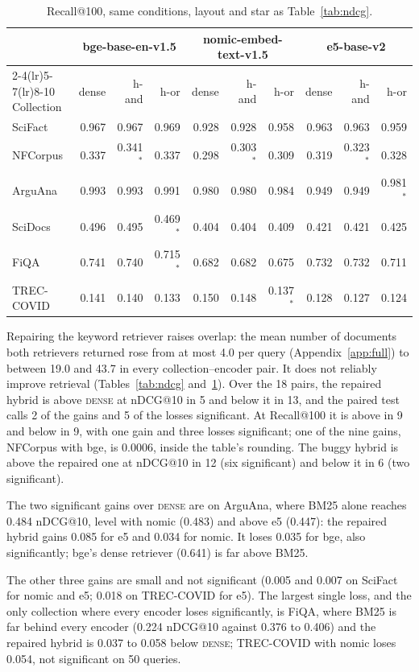 \documentclass[11pt]{article}
\begin{document}
\begin{table}[h]
\centering
\small
\begin{tabular}{lrrrrrrrrr}
\toprule
 & \multicolumn{3}{c}{bge-base-en-v1.5} & \multicolumn{3}{c}{nomic-embed-text-v1.5} & \multicolumn{3}{c}{e5-base-v2} \\
\cmidrule(lr){2-4}\cmidrule(lr){5-7}\cmidrule(lr){8-10}
Collection & dense & h-and & h-or & dense & h-and & h-or & dense & h-and & h-or \\
\midrule
SciFact & 0.967 & 0.967 & 0.969 & 0.928 & 0.928 & 0.958 & 0.963 & 0.963 & 0.959 \\
NFCorpus & 0.337 & 0.341$^{*}$ & 0.337 & 0.298 & 0.303$^{*}$ & 0.309 & 0.319 & 0.323$^{*}$ & 0.328 \\
ArguAna & 0.993 & 0.993 & 0.991 & 0.980 & 0.980 & 0.984 & 0.949 & 0.949 & 0.981$^{*}$ \\
SciDocs & 0.496 & 0.495 & 0.469$^{*}$ & 0.404 & 0.404 & 0.409 & 0.421 & 0.421 & 0.425 \\
FiQA & 0.741 & 0.740 & 0.715$^{*}$ & 0.682 & 0.682 & 0.675 & 0.732 & 0.732 & 0.711 \\
TREC-COVID & 0.141 & 0.140 & 0.133 & 0.150 & 0.148 & 0.137$^{*}$ & 0.128 & 0.127 & 0.124 \\
\bottomrule
\end{tabular}
\caption{Recall@100, same conditions, layout and star as Table~\ref{tab:ndcg}.}
\label{tab:recall}
\end{table}

Repairing the keyword retriever raises overlap: the mean number of documents both retrievers returned rose from at most 4.0 per query (Appendix~\ref{app:full}) to between 19.0 and 43.7 in every collection--encoder pair. It does not reliably improve retrieval (Tables~\ref{tab:ndcg} and~\ref{tab:recall}). Over the 18 pairs, the repaired hybrid is above \textsc{dense} at nDCG@10 in 5 and below it in 13, and the paired test calls 2 of the gains and 5 of the losses significant. At Recall@100 it is above in 9 and below in 9, with one gain and three losses significant; one of the nine gains, NFCorpus with bge, is 0.0006, inside the table's rounding. The buggy hybrid is above the repaired one at nDCG@10 in 12 (six significant) and below it in 6 (two significant).

{\sloppy The two significant gains over \textsc{dense} are on ArguAna, where BM25 alone reaches 0.484 nDCG@10, level with nomic (0.483) and above e5 (0.447): the repaired hybrid gains 0.085 for e5 and 0.034 for nomic. It loses 0.035 for bge, also significantly; bge's dense retriever (0.641) is far above BM25.\par} The other three gains are small and not significant (0.005 and 0.007 on SciFact for nomic and e5; 0.018 on TREC-COVID for e5). The largest single loss, and the only collection where every encoder loses significantly, is FiQA, where BM25 is far behind every encoder (0.224 nDCG@10 against 0.376 to 0.406) and the repaired hybrid is 0.037 to 0.058 below \textsc{dense}; TREC-COVID with nomic loses 0.054, not significant on 50 queries.
\end{document}
